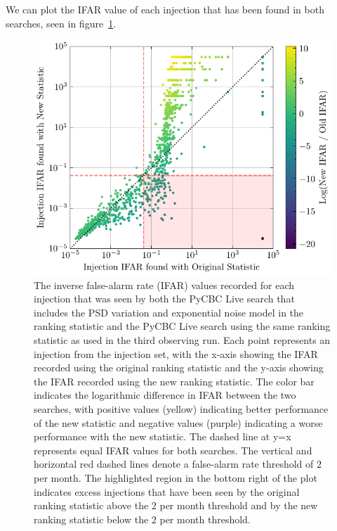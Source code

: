 We can plot the IFAR value of each injection that has been found in both searches, seen in 
figure~\ref{5:fig:ifar-ifar-fits-psdvar-shaded}.
%
\begin{figure}
      \centering
    \includegraphics[width=1.0\textwidth]{images/5_pycbclive/fits-psd/fits_psd_ifar_vs_ifar_shaded_region.pdf}
    \caption{The inverse false-alarm rate (IFAR) values recorded for each injection that was seen by both the PyCBC Live search that includes the PSD variation and exponential noise model in the ranking statistic and the PyCBC Live search using the same ranking statistic as used in the third observing run. Each point represents an injection from the injection set, with the x-axis showing the IFAR recorded using the original ranking statistic and the y-axis showing the IFAR recorded using the new ranking statistic. The color bar indicates the logarithmic difference in IFAR between the two searches, with positive values (yellow) indicating better performance of the new statistic and negative values (purple) indicating a worse performance with the new statistic. The dashed line at y=x represents equal IFAR values for both searches. The vertical and horizontal red dashed lines denote a false-alarm rate threshold of $2$ per month. The highlighted region in the bottom right of the plot indicates excess injections that have been seen by the original ranking statistic above the $2$ per month threshold and by the new ranking statistic below the $2$ per month threshold.}
    \label{5:fig:ifar-ifar-fits-psdvar-shaded}
\end{figure}
